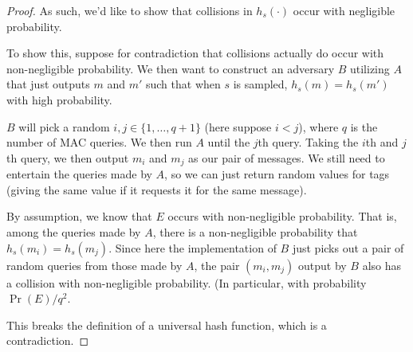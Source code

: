 \begin{proof}
    As such, we'd like to show that collisions in $h_s(\cdot)$ occur with negligible probability.

    To show this, suppose for contradiction that collisions actually do occur with non-negligible probability. We then want to construct an adversary $B$ utilizing $A$ that just outputs $m$ and $m'$ such that when $s$ is sampled, $h_s(m) = h_s(m')$ with high probability.

    $B$ will pick a random $i, j \in \{1, \ldots, q+1\}$ (here suppose $i < j$), where $q$ is the number of MAC queries. We then run $A$ until the $j$th query. Taking the $i$th and $j$th query, we then output $m_i$ and $m_j$ as our pair of messages. We still need to entertain the queries made by $A$, so we can just return random values for tags (giving the same value if it requests it for the same message).

    \begin{center}
    \end{center}

    By assumption, we know that $E$ occurs with non-negligible probability. That is, among the queries made by $A$, there is a non-negligible probability that $h_s(m_i) = h_s(m_j)$. Since here the implementation of $B$ just picks out a pair of random queries from those made by $A$, the pair $(m_i, m_j)$ output by $B$ also has a collision with non-negligible probability. (In particular, with probability $\Pr(E) / q^2$.

    This breaks the definition of a universal hash function, which is a contradiction.
\end{proof}

